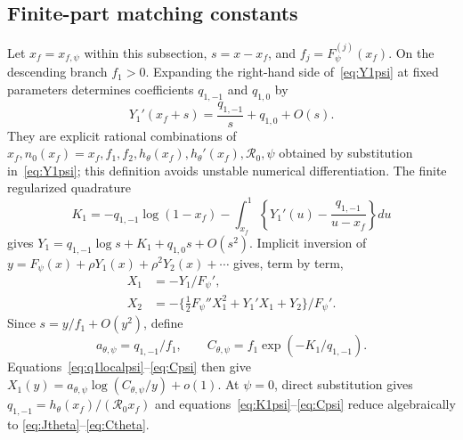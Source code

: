 \documentclass[11pt,a4paper]{article}
\newcommand{\Rzero}{\mathcal R_0}
\begin{document}
\subsection{Finite-part matching constants}
Let $x_f=x_{f,\psi}$ within this subsection, $s=x-x_f$, and
$f_j=F_\psi^{(j)}(x_f)$.  On the descending branch $f_1>0$.  Expanding the
right-hand side of~\eqref{eq:Y1psi} at fixed parameters determines coefficients
$q_{1,-1}$ and $q_{1,0}$ by
\begin{equation}
 Y_1'(x_f+s)=\frac{q_{1,-1}}s+q_{1,0}+O(s).
 \label{eq:q1localpsi}
\end{equation}
They are explicit rational combinations of
$x_f,n_0(x_f)=x_f,f_1,f_2,h_\theta(x_f),h_\theta'(x_f),\Rzero,\psi$ obtained by
substitution in~\eqref{eq:Y1psi}; this definition avoids unstable numerical
differentiation.  The finite regularized quadrature
\begin{equation}
 K_1=-q_{1,-1}\log(1-x_f)
 -\int_{x_f}^1\left\{Y_1'(u)-\frac{q_{1,-1}}{u-x_f}\right\}du
 \label{eq:K1psi}
\end{equation}
gives $Y_1=q_{1,-1}\log s+K_1+q_{1,0}s+O(s^2)$.
Implicit inversion of
$y=F_\psi(x)+\rho Y_1(x)+\rho^2Y_2(x)+\cdots$ gives, term by term,
\begin{align}
 X_1&=-Y_1/F_\psi',\nonumber\\
 X_2&=-\{\tfrac12F_\psi''X_1^2+Y_1'X_1+Y_2\}/F_\psi'.
 \label{eq:inverse-psi}
\end{align}
Since $s=y/f_1+O(y^2)$, define
\begin{equation}
 a_{\theta,\psi}=q_{1,-1}/f_1,\qquad
 C_{\theta,\psi}=f_1\exp(-K_1/q_{1,-1}).
 \label{eq:Cpsi}
\end{equation}
Equations~\eqref{eq:q1localpsi}--\eqref{eq:Cpsi} then give
$X_1(y)=a_{\theta,\psi}\log(C_{\theta,\psi}/y)+o(1)$.
At $\psi=0$, direct substitution gives
$q_{1,-1}=h_\theta(x_f)/(\Rzero x_f)$ and
equations~\eqref{eq:K1psi}--\eqref{eq:Cpsi} reduce algebraically to
\eqref{eq:Jtheta}--\eqref{eq:Ctheta}.
\end{document}
